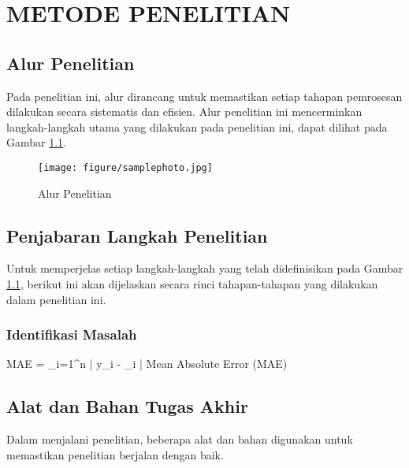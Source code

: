\newpage
\chapter{METODE PENELITIAN} \label{Bab III}

\section{Alur Penelitian} \label{III.Alur}
Pada penelitian ini, alur dirancang untuk memastikan setiap tahapan pemrosesan dilakukan secara sistematis dan efisien. Alur penelitian ini mencerminkan langkah-langkah utama yang dilakukan pada penelitian ini, dapat dilihat pada Gambar \ref{fig:3.alur}. \par

\begin{figure}[H] %
    \centering
    \texttt{[image: figure/samplephoto.jpg]}
    \caption{Alur Penelitian}
    \label{fig:3.alur}
\end{figure}

\section{Penjabaran Langkah Penelitian} \label{III.Jabar Alur}
Untuk memperjelas setiap langkah-langkah yang telah didefinisikan pada Gambar \ref{fig:3.alur}, berikut ini akan dijelaskan secara rinci tahapan-tahapan yang dilakukan dalam penelitian ini.

\subsection{Identifikasi Masalah} \label{III.Identifikasi_masalah}
\lipsum[1] %
\begin{equationcaptioned}[eq:3.mae]{
		MAE =  \sum_{i=1}^{n} \left| y_i - _i \right|
	}{
		Mean Absolute Error (MAE)
	}
\end{equationcaptioned}

\section{Alat dan Bahan Tugas Akhir} \label{III.Alat dan Bahan}
Dalam menjalani penelitian, beberapa alat dan bahan digunakan untuk memastikan penelitian berjalan dengan baik.\par

